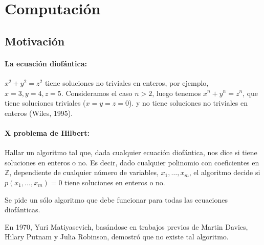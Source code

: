 \section{Computación}

\subsection{Motivación}

\paragraph{La ecuación diofántica:} $x^2+y^2=z^2$ tiene soluciones no triviales en enteros, por ejemplo, $x=3, y=4, z=5$. Consideramos el caso $n>2$, luego tenemos $x^n+y^n = z^n$, que tiene soluciones triviales ($x=y=z=0$). y no tiene soluciones no triviales en enteros (Wiles, 1995).

\paragraph{X problema de Hilbert:} Hallar un algoritmo tal que, dada cualquier ecuación diofántica, nos dice si tiene soluciones en enteros o no. Es decir, dado cualquier polinomio con coeficientes en $\mathbb{Z}$, dependiente de cualquier número de variables, $x_1,\hdots, x_m$, el algoritmo decide si $p(x_1, \hdots, x_m)=0$ tiene soluciones en enteros o no.
\begin{obs}
	Se pide un sólo algoritmo que debe funcionar para todas las ecuaciones diofánticas.
\end{obs}
En 1970, Yuri Matiyasevich, basándose en trabajos previos de Martin Davies, Hilary Putnam y Julia Robinson, demostró que no existe tal algoritmo.
